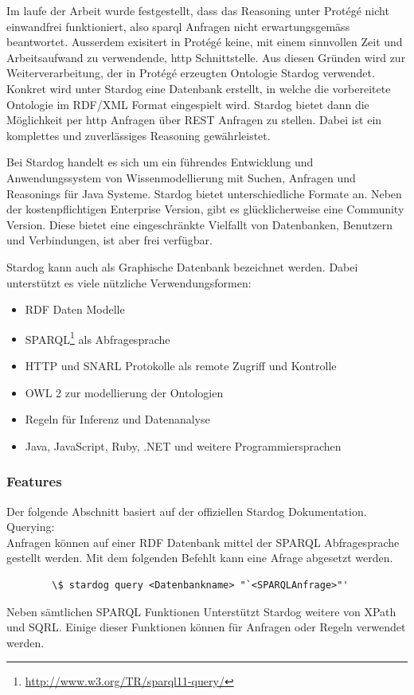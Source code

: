 Im laufe der Arbeit wurde festgestellt, dass das Reasoning unter Protégé nicht einwandfrei funktioniert, also sparql Anfragen nicht erwartungsgemäss beantwortet. Ausserdem exisitert in Protégé keine, mit einem sinnvollen Zeit und Arbeitsaufwand zu verwendende, http Schnittstelle. Aus diesen Gründen wird zur Weiterverarbeitung, der in Protégé erzeugten Ontologie Stardog verwendet.\\
Konkret wird unter Stardog eine Datenbank erstellt, in welche die vorbereitete Ontologie im RDF/XML Format eingespielt wird. Stardog bietet dann die Möglichkeit per http Anfragen über REST Anfragen zu stellen. Dabei ist ein komplettes und zuverlässiges Reasoning gewährleistet.

Bei Stardog handelt es sich um ein führendes Entwicklung und Anwendungssystem von Wissenmodellierung mit Suchen, Anfragen und Reasonings für Java Systeme. Stardog bietet unterschiedliche Formate an. Neben der kostenpflichtigen Enterprise Version, gibt es glücklicherweise eine Community Version. Diese bietet eine eingeschränkte Vielfallt von Datenbanken, Benutzern und Verbindungen, ist aber frei verfügbar.\cite{stardog}

Stardog kann auch als Graphische Datenbank bezeichnet werden. Dabei unterstützt es viele nützliche Verwendungsformen:
\begin{itemize}
	\item RDF Daten Modelle
	\item SPARQL\footnote{\url{http://www.w3.org/TR/sparql11-query/}} als Abfragesprache
	\item HTTP und SNARL Protokolle als remote Zugriff und Kontrolle
	\item OWL 2 zur modellierung der Ontologien
	\item Regeln für Inferenz und Datenanalyse
	\item Java, JavaScript, Ruby, .NET und weitere Programmiersprachen
\end{itemize}
\cite{stardogDocu}

\subsubsection{Features}
\label{ssubsec:features}
Der folgende Abschnitt basiert auf der offiziellen Stardog Dokumentation.\cite{stardogDocuUsing}\\

Querying:\\
Anfragen können auf einer RDF Datenbank mittel der SPARQL Abfragesprache gestellt werden. Mit dem folgenden Befehlt kann eine Afrage abgesetzt werden.\\
\begin{lstlisting}
		\$ stardog query <Datenbankname> "`<SPARQLAnfrage>"'
\end{lstlisting}	
Neben sämtlichen SPARQL Funktionen Unterstützt Stardog weitere von XPath und SQRL. Einige dieser Funktionen können für Anfragen oder Regeln verwendet werden.

